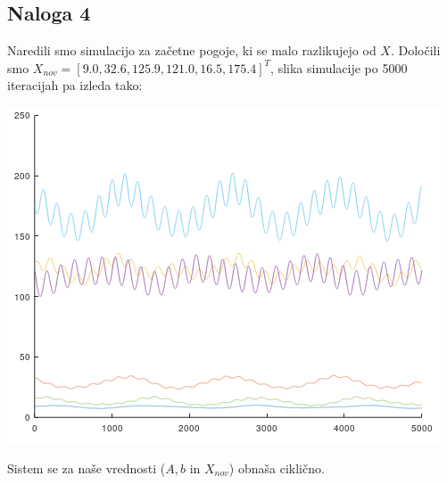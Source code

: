 \documentclass[a4paper, 12pt]{article}
\begin{document}
\subsection{Naloga 4}
Naredili smo simulacijo za začetne pogoje, ki se malo razlikujejo od $ X $. Določili smo
$ X_{nov} = \left[9.0, 32.6, 125.9, 121.0, 16.5, 175.4\right]^{T} $, slika simulacije po 5000 iteracijah
pa izleda tako:\\
\begin{center}
	\includegraphics{stationary_almost.png}
\end{center}
Sistem se za naše vrednosti ($ A, b $ in $ X_{nov} $) obnaša ciklično.
\end{document}
